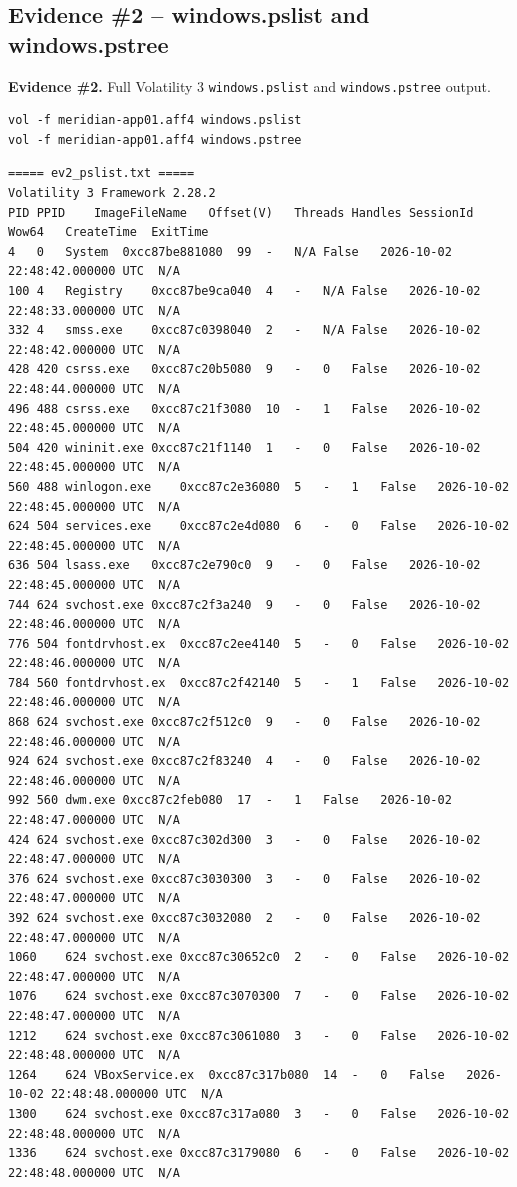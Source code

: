 \documentclass[11pt,letterpaper]{article}
\newcommand{\labstep}[1]{%
  \Needspace{6\baselineskip}%
  \subsection*{#1}%
  \nopagebreak
}
\newcommand{\evidencebox}[2]{%
  \par\vspace{0.25em}%
  \noindent\colorbox{okbox}{\parbox{\dimexpr\linewidth-2\fboxsep\relax}{%
    \textbf{Evidence \#{#1}.} #2}}%
  \par\vspace{0.25em}%
}
\begin{document}
\labstep{Evidence \#2 -- windows.pslist and windows.pstree}

\evidencebox{2}{Full Volatility 3 \texttt{windows.pslist} and \texttt{windows.pstree} output.}

\begin{lstlisting}
vol -f meridian-app01.aff4 windows.pslist
vol -f meridian-app01.aff4 windows.pstree
\end{lstlisting}

\begin{lstlisting}
===== ev2_pslist.txt =====
﻿Volatility 3 Framework 2.28.2
PID	PPID	ImageFileName	Offset(V)	Threads	Handles	SessionId	Wow64	CreateTime	ExitTime
4	0	System	0xcc87be881080	99	-	N/A	False	2026-10-02 22:48:42.000000 UTC	N/A
100	4	Registry	0xcc87be9ca040	4	-	N/A	False	2026-10-02 22:48:33.000000 UTC	N/A
332	4	smss.exe	0xcc87c0398040	2	-	N/A	False	2026-10-02 22:48:42.000000 UTC	N/A
428	420	csrss.exe	0xcc87c20b5080	9	-	0	False	2026-10-02 22:48:44.000000 UTC	N/A
496	488	csrss.exe	0xcc87c21f3080	10	-	1	False	2026-10-02 22:48:45.000000 UTC	N/A
504	420	wininit.exe	0xcc87c21f1140	1	-	0	False	2026-10-02 22:48:45.000000 UTC	N/A
560	488	winlogon.exe	0xcc87c2e36080	5	-	1	False	2026-10-02 22:48:45.000000 UTC	N/A
624	504	services.exe	0xcc87c2e4d080	6	-	0	False	2026-10-02 22:48:45.000000 UTC	N/A
636	504	lsass.exe	0xcc87c2e790c0	9	-	0	False	2026-10-02 22:48:45.000000 UTC	N/A
744	624	svchost.exe	0xcc87c2f3a240	9	-	0	False	2026-10-02 22:48:46.000000 UTC	N/A
776	504	fontdrvhost.ex	0xcc87c2ee4140	5	-	0	False	2026-10-02 22:48:46.000000 UTC	N/A
784	560	fontdrvhost.ex	0xcc87c2f42140	5	-	1	False	2026-10-02 22:48:46.000000 UTC	N/A
868	624	svchost.exe	0xcc87c2f512c0	9	-	0	False	2026-10-02 22:48:46.000000 UTC	N/A
924	624	svchost.exe	0xcc87c2f83240	4	-	0	False	2026-10-02 22:48:46.000000 UTC	N/A
992	560	dwm.exe	0xcc87c2feb080	17	-	1	False	2026-10-02 22:48:47.000000 UTC	N/A
424	624	svchost.exe	0xcc87c302d300	3	-	0	False	2026-10-02 22:48:47.000000 UTC	N/A
376	624	svchost.exe	0xcc87c3030300	3	-	0	False	2026-10-02 22:48:47.000000 UTC	N/A
392	624	svchost.exe	0xcc87c3032080	2	-	0	False	2026-10-02 22:48:47.000000 UTC	N/A
1060	624	svchost.exe	0xcc87c30652c0	2	-	0	False	2026-10-02 22:48:47.000000 UTC	N/A
1076	624	svchost.exe	0xcc87c3070300	7	-	0	False	2026-10-02 22:48:47.000000 UTC	N/A
1212	624	svchost.exe	0xcc87c3061080	3	-	0	False	2026-10-02 22:48:48.000000 UTC	N/A
1264	624	VBoxService.ex	0xcc87c317b080	14	-	0	False	2026-10-02 22:48:48.000000 UTC	N/A
1300	624	svchost.exe	0xcc87c317a080	3	-	0	False	2026-10-02 22:48:48.000000 UTC	N/A
1336	624	svchost.exe	0xcc87c3179080	6	-	0	False	2026-10-02 22:48:48.000000 UTC	N/A

\end{lstlisting}
\end{document}
